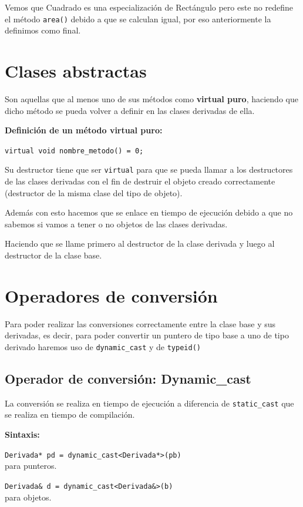 Vemos que Cuadrado es una especialización de Rectángulo pero este no redefine el método \texttt{area()} debido a que se calculan igual, por eso anteriormente la definimos como final.

\section{Clases abstractas}

Son aquellas que al menos uno de sus métodos como \textbf{virtual puro}, haciendo que dicho método se pueda volver a definir en las clases derivadas de ella.

\textbf{\large{Definición de un método virtual puro:}}
\begin{center}
	\texttt{virtual void nombre\_metodo() = 0;}
\end{center}

Su destructor tiene que ser \texttt{virtual} para que se pueda llamar a los destructores de las clases derivadas con el fin de destruir el objeto creado correctamente (destructor de la misma clase del tipo de objeto).

Además con esto hacemos que se enlace en tiempo de ejecución debido a que no sabemos si vamos a tener o no objetos de las clases derivadas.

Haciendo que se llame primero al destructor de la clase derivada y luego al destructor de la clase base.


\section{Operadores de conversión}
Para poder realizar las conversiones correctamente entre la clase base y sus derivadas, es decir, para poder convertir un puntero de tipo base a uno de tipo derivado haremos uso de \texttt{dynamic\_cast} y de \texttt{typeid()}

\subsection{Operador de conversión: Dynamic\_cast}
La conversión se realiza en tiempo de ejecución a diferencia de \texttt{static\_cast} que se realiza en tiempo de compilación.

\textbf{\large Sintaxis:}
\begin{center}
	\texttt{Derivada* pd = dynamic\_cast<Derivada*>(pb)}\\
	para punteros.
	
	\texttt{Derivada\& d = dynamic\_cast<Derivada\&>(b)}\\
	para objetos.
\end{center}

